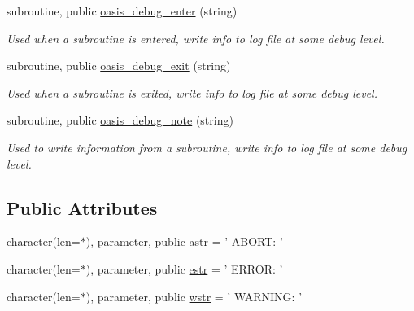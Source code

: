 \begin{DoxyCompactItemize}
subroutine, public \hyperlink{classmod__oasis__sys_ab963e928a34a1521ec2c1921cc956cc5}{oasis\+\_\+debug\+\_\+enter} (string)
\begin{DoxyCompactList}\small\item\em Used when a subroutine is entered, write info to log file at some debug level. \end{DoxyCompactList}\item 
subroutine, public \hyperlink{classmod__oasis__sys_a349f71cba2df935179d78f3858992c83}{oasis\+\_\+debug\+\_\+exit} (string)
\begin{DoxyCompactList}\small\item\em Used when a subroutine is exited, write info to log file at some debug level. \end{DoxyCompactList}\item 
subroutine, public \hyperlink{classmod__oasis__sys_a8e488f6a9a829762324519c6dd493912}{oasis\+\_\+debug\+\_\+note} (string)
\begin{DoxyCompactList}\small\item\em Used to write information from a subroutine, write info to log file at some debug level. \end{DoxyCompactList}\end{DoxyCompactItemize}
\subsection*{Public Attributes}
\begin{DoxyCompactItemize}
\item 
character(len=$\ast$), parameter, public \hyperlink{classmod__oasis__sys_aad26202d309c5b33de4cddb54c7edc99}{astr} = ' A\+B\+O\+R\+T\+: '
\item 
character(len=$\ast$), parameter, public \hyperlink{classmod__oasis__sys_a0f6e0376585c6f39d653f5ab05e80e8f}{estr} = ' E\+R\+R\+O\+R\+: '
\item 
character(len=$\ast$), parameter, public \hyperlink{classmod__oasis__sys_a4e16ba69c68a3a39c8b8aa3b92234ce1}{wstr} = ' W\+A\+R\+N\+I\+N\+G\+: '
\end{DoxyCompactItemize}

